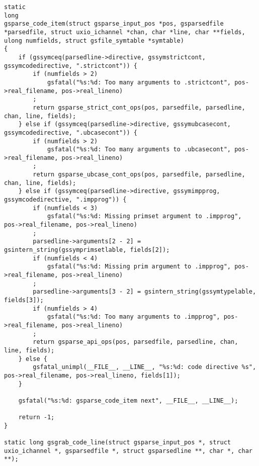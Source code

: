 \documentclass{report}
\begin{document}
\begin{verbatim}
static
long
gsparse_code_item(struct gsparse_input_pos *pos, gsparsedfile *parsedfile, struct uxio_ichannel *chan, char *line, char **fields, ulong numfields, struct gsfile_symtable *symtable)
{
    if (gssymceq(parsedline->directive, gssymstrictcont, gssymcodedirective, ".strictcont")) {
        if (numfields > 2)
            gsfatal("%s:%d: Too many arguments to .strictcont", pos->real_filename, pos->real_lineno)
        ;
        return gsparse_strict_cont_ops(pos, parsedfile, parsedline, chan, line, fields);
    } else if (gssymceq(parsedline->directive, gssymubcasecont, gssymcodedirective, ".ubcasecont")) {
        if (numfields > 2)
            gsfatal("%s:%d: Too many arguments to .ubcasecont", pos->real_filename, pos->real_lineno)
        ;
        return gsparse_ubcase_cont_ops(pos, parsedfile, parsedline, chan, line, fields);
    } else if (gssymceq(parsedline->directive, gssymimpprog, gssymcodedirective, ".impprog")) {
        if (numfields < 3)
            gsfatal("%s:%d: Missing primset argument to .impprog", pos->real_filename, pos->real_lineno)
        ;
        parsedline->arguments[2 - 2] = gsintern_string(gssymprimsetlable, fields[2]);
        if (numfields < 4)
            gsfatal("%s:%d: Missing prim argument to .impprog", pos->real_filename, pos->real_lineno)
        ;
        parsedline->arguments[3 - 2] = gsintern_string(gssymtypelable, fields[3]);
        if (numfields > 4)
            gsfatal("%s:%d: Too many arguments to .impprog", pos->real_filename, pos->real_lineno)
        ;
        return gsparse_api_ops(pos, parsedfile, parsedline, chan, line, fields);
    } else {
        gsfatal_unimpl(__FILE__, __LINE__, "%s:%d: code directive %s", pos->real_filename, pos->real_lineno, fields[1]);
    }

    gsfatal("%s:%d: gsparse_code_item next", __FILE__, __LINE__);

    return -1;
}

static long gsgrab_code_line(struct gsparse_input_pos *, struct uxio_ichannel *, gsparsedfile *, struct gsparsedline **, char *, char **);


\end{verbatim}
\end{document}
